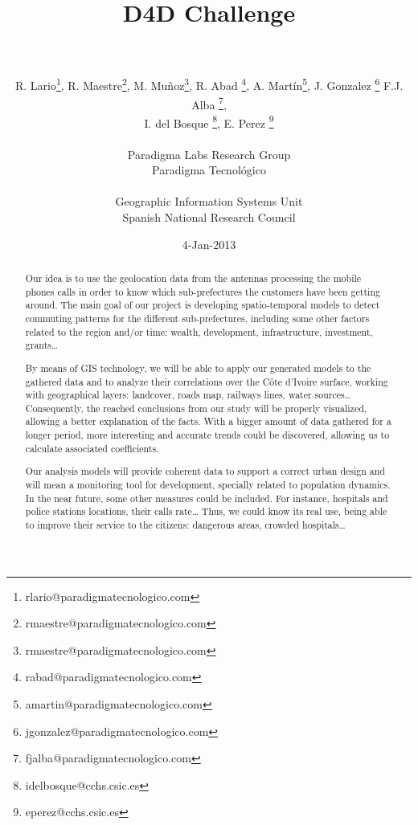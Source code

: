 \documentclass[a4paper,11pt]{article}
\begin{document}
\title{{\huge D4D Challenge} \\  \\ }

\author{{
				R. Lario\footnote{rlario@paradigmatecnologico.com}, 
				R. Maestre\footnote{rmaestre@paradigmatecnologico.com}, 
				M. Muñoz\footnote{rmaestre@paradigmatecnologico.com}, 
				R. Abad \footnote{rabad@paradigmatecnologico.com}, 
				A. Martín\footnote{amartin@paradigmatecnologico.com}, 
				J. Gonzalez \footnote{jgonzalez@paradigmatecnologico.com}
				F.J. Alba \footnote{fjalba@paradigmatecnologico.com}, \\
				I. del Bosque \footnote{idelbosque@cchs.csic.es}, 
				E. Perez \footnote{eperez@cchs.csic.es}
				}\\ \\
{\small Paradigma Labs Research Group\\ Paradigma Tecnológico} \\ \\
{\small Geographic Information Systems Unit \\ Spanish National Research Council}}

\date{4-Jan-2013}
\maketitle

\begin{abstract} 
Our idea is to use the geolocation data from the antennas processing the mobile phones calls in order to know which sub-prefectures the customers have been getting around. The main goal of our project is developing spatio-temporal models to detect commuting patterns for the different sub-prefectures, including some other factors related to the region and/or time: wealth, development, infrastructure, investment, grants…

By means of GIS technology, we will be able to apply our generated models to the gathered data and to analyze their correlations over the Côte d’Ivoire surface, working with geographical layers: landcover, roads map, railways lines, water sources… Consequently, the reached conclusions from our study will be properly visualized, allowing a better explanation of the facts. With a bigger amount of data gathered for a longer period, more interesting and accurate trends could be discovered, allowing us to calculate associated coefficients.

Our analysis models will provide coherent data to support a correct urban design and will mean a monitoring tool for development, specially related to population dynamics.
In the near future, some other measures could be included. For instance, hospitals and police stations locations, their calls rate… Thus, we could know its real use, being able to improve their service to the citizens: dangerous areas, crowded hospitals…
\end{abstract}

\newpage
\setcounter{secnumdepth}{0}















\newpage


\end{document}
